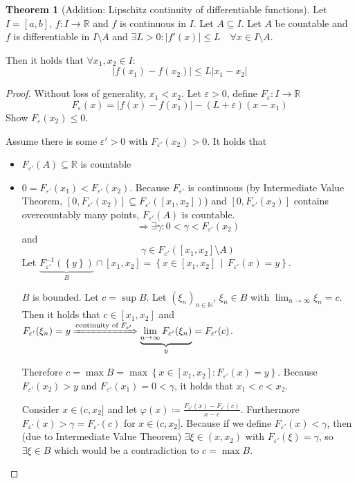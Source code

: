 \documentclass[a4paper,landscape,twocolumn]{article}
\theoremstyle{definition}
\newtheorem{theorem}{Theorem}
\newcommand\set[1]{\left\{#1\right\}}
\newcommand\setdef[2]{\left\{#1\,\middle|\,#2\right\}}
\newcommand\abs[1]{\left|#1\right|}
\begin{document}
\begin{theorem}[Addition: Lipschitz continuity of differentiable functions]
  Let $I = [a,b]$, $f: I \to \mathbb R$ and $f$ is continuous in $I$.
  Let $A \subseteq I$. Let $A$ be countable and $f$ is differentiable in $I \setminus A$
  and $\exists L > 0: \abs{f'(x)} \leq L \quad\forall x \in I \setminus A$.

  Then it holds that $\forall x_1, x_2 \in I$:
  \[ \abs{f(x_1) - f(x_2)} \leq L\abs{x_1 - x_2} \]
\end{theorem}
\begin{proof}
  Without loss of generality, $x_1 < x_2$. Let $\varepsilon > 0$, define
  $F_\varepsilon: I \to \mathbb R$
  \[ F_{\varepsilon}(x) = \abs{f(x) - f(x_1)} - (L + \varepsilon) (x - x_1) \]
  Show $F_\varepsilon(x_2) \leq 0$.

  Assume there is some $\varepsilon' > 0$ with $F_{\varepsilon'}(x_2) > 0$.
  It holds that
  \begin{itemize}
    \item $F_{\varepsilon'}(A) \subseteq \mathbb R$ is countable
    \item $0 = F_{\varepsilon'}(x_1) < F_{\varepsilon'}(x_2)$.
      Because $F_{\varepsilon'}$ is continuous (by Intermediate Value Theorem,
      $[0,F_{\varepsilon'}(x_2)] \subseteq F_{\varepsilon'}([x_1, x_2])$)
      and $[0, F_{\varepsilon'}(x_2)]$ contains overcountably many points,
      $F_{\varepsilon'}(A)$ is countable.
      \[ \Rightarrow \exists \gamma: 0 < \gamma < F_{\varepsilon'}(x_2) \]
      and
      \[ \gamma \in F_{\varepsilon'}([x_1, x_2] \setminus A) \]
      Let $\underbrace{F_{\varepsilon'}^{-1}(\set{y})}_{B} \cap [x_1, x_2]
      = \setdef{x \in [x_1, x_2]}{F_{\varepsilon'}(x) = y}$.

      $B$ is bounded.
      Let $c = \sup{B}$. Let $(\xi_n)_{n \in \mathbb N}$, $\xi_n \in B$ with
      $\lim_{n\to\infty} \xi_n = c$. Then it holds that $c \in [x_1, x_2]$
      and $F_{\varepsilon'}(\xi_n) = y \xRightarrow{\text{continuity of } F_{\varepsilon'}}
      \underbrace{\lim_{n\to\infty} F_{\varepsilon'}(\xi_n)}_{y} = F_{\varepsilon'}(c)$.

      Therefore $c = \max{B} = \max\set{x \in [x_1, x_2]: F_{\varepsilon'}(x) = y}$.
      Because $F_{\varepsilon'}(x_2) > y$ and $F_{\varepsilon'}(x_1) = 0 < \gamma$,
      it holds that $x_1 < c < x_2$.

      Consider $x \in (c, x_2]$ and let $\varphi(x) \coloneqq
      \frac{F_{\varepsilon'}(x) - F_{\varepsilon'}(c)}{x - c}$.
      Furthermore $F_{\varepsilon'}(x) > \gamma = F_{\varepsilon'}(c)$ for $x \in (c,x_2]$.
      Because if we define $F_{\varepsilon'}(x) < \gamma$, then (due to Intermediate Value Theorem)
      $\exists \xi \in (x, x_2)$ with $F_{\varepsilon'}(\xi) = \gamma$, so $\exists \xi \in B$
      which would be a contradiction to $c = \max{B}$.


\end{itemize}
\end{proof}
\end{document}
